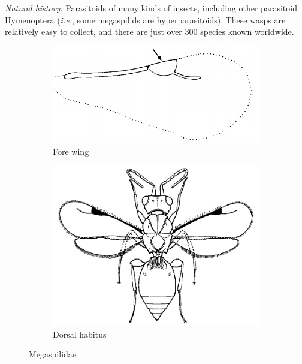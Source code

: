 \documentclass[letterpaper, 11pt]{article}
\begin{document}
\noindent{}\textit{Natural history:} Parasitoids of many kinds of insects, including other parasitoid Hymenoptera (\textit{i.e.}, some megaspilids are hyperparasitoids). These wasps are relatively easy to collect, and there are just over 300 species known worldwide.\\

\begin{figure}[ht!]
  \centering
\begin{subfigure}[ht!]{0.45\textwidth}
    \includegraphics[width=\textwidth]{MegaspilidWing}
  \caption{Fore wing \citep[][pg. 566]{goulet1993hymenoptera}}
  \label{fig:megaspilid1}
\end{subfigure}
    \hfill
\begin{subfigure}[ht!]{0.45\textwidth}
    \includegraphics[width=\textwidth]{MegaspilidHabitus}
  \caption{Dorsal habitus \citep[][Fig. 209]{goulet1993hymenoptera}}
  \label{fig:megaspilid2}
\end{subfigure}
    \caption{Megaspilidae}\label{fig:megaspilid}
\end{figure}
\end{document}
